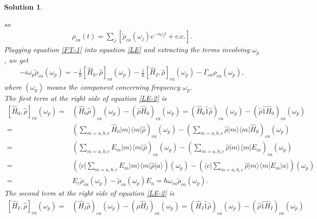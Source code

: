 \documentclass[UTF8,10pt,a4paper]{article}
\theoremstyle{Problem}
\theoremstyle{Solution}
\newtheorem*{sol}{Solution}
\begin{document}
\begin{sol}
\begin{enumerate}
        so
        \begin{align}
            \label{FT-1}
            \rho_{ca}(t)=\sum_j\left[\tilde{\rho}_{ca}(\omega_j)e^{-i\omega_jt}+\text{c.c.}\right].
        \end{align}
        Plugging equation \eqref{FT-1} into equation \eqref{LE} and extracting the terms involving $\omega_p$, we get
        \begin{align}
            \label{LE-2}
            -i\omega_p\tilde{\rho}_{ca}(\omega_p)=-\frac{i}{\hbar}[\hat{H}_0,\hat{\rho}]_{ca}(\omega_p)-\frac{i}{\hbar}[\hat{H}_I,\hat{\rho}]_{ca}(\omega_p)-\Gamma_{ca}\rho_{ca}(\omega_p),
        \end{align}
        where $(\omega_p)$ means the component concerning frequency $\omega_p$.\\
        The first term at the right side of equation \eqref{LE-2} is
        \begin{align}
            \label{LE-2-1}
            \nonumber[\hat{H}_0,\hat{\rho}]_{ca}(\omega_p)=&(\hat{H}_0\hat{\rho})_{ca}(\omega_p)-(\hat{\rho}\hat{H}_0)_{ca}(\omega_p)=(\hat{H}_0\hat{1}\hat{\rho})_{ca}(\omega_p)-(\hat{\rho}\hat{1}\hat{H}_0)_{ca}(\omega_p)\\
            \nonumber=&\left(\sum_{m=a,b,c}\hat{H}_0\lvert m\rangle\langle m\rvert\hat{\rho}\right)_{ca}(\omega_p)-\left(\sum_{m=a,b,c}\hat{\rho}\lvert m\rangle\langle m\rvert\hat{H}_0\right)_{ca}(\omega_p)\\
            \nonumber=&\left(\sum_{m=a,b,c}E_m\lvert m\rangle\langle m\rvert\hat{\rho}\right)_{ca}(\omega_p)-\left(\sum_{m=a,b,c}\hat{\rho}\lvert m\rangle\langle m\rvert E_m\right)_{ca}(\omega_p)\\
            \nonumber=&\left(\langle c\rvert\sum_{m=a,b,c}E_m\lvert m\rangle\langle m\rvert\hat{\rho}\lvert a\rangle\right)(\omega_p)-\left(\langle c\rvert\sum_{m=a,b,c}\hat{\rho}\lvert m\rangle\langle m\rvert E_m\lvert a\rangle\right)(\omega_p)\\
            =&E_c\tilde{\rho}_{ca}(\omega_p)-\tilde{\rho}_{ca}(\omega_p)E_a=\hbar\omega_{ca}\tilde{\rho}_{ca}(\omega_p).
        \end{align}
        The second term at the right side of equation \eqref{LE-2} is
        \begin{align}
            \nonumber[\hat{H}_I,\hat{\rho}]_{ca}(\omega_p)=&(\hat{H}_I\hat{\rho})_{ca}(\omega_p)-(\hat{\rho}\hat{H}_I)_{ca}(\omega_p)=(\hat{H}_I\hat{1}\hat{\rho})_{ca}(\omega_p)-(\hat{\rho}\hat{1}\hat{H}_I)_{ca}(\omega_p)\\

\end{align}
\end{enumerate}
\end{sol}
\end{document}
